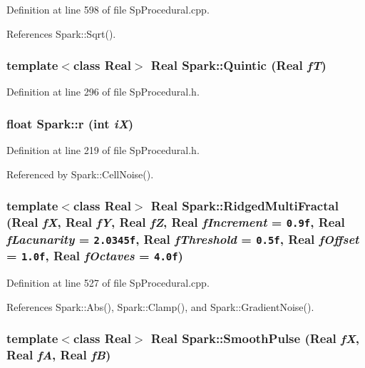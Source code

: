 Definition at line 598 of file Sp\-Procedural.cpp.

References Spark::Sqrt().
\subsubsection{\setlength{\rightskip}{0pt plus 5cm}template$<$class Real$>$ Real Spark::Quintic (Real {\em f\-T})}\label{namespaceSpark_a99}


Definition at line 296 of file Sp\-Procedural.h.
\subsubsection{\setlength{\rightskip}{0pt plus 5cm}float Spark::r (int {\em i\-X})\hspace{0.3cm}{\tt  [inline]}}\label{namespaceSpark_a92}


Definition at line 219 of file Sp\-Procedural.h.

Referenced by Spark::Cell\-Noise().
\subsubsection{\setlength{\rightskip}{0pt plus 5cm}template$<$class Real$>$ Real Spark::Ridged\-Multi\-Fractal (Real {\em f\-X}, Real {\em f\-Y}, Real {\em f\-Z}, Real {\em f\-Increment} = {\tt 0.9f}, Real {\em f\-Lacunarity} = {\tt 2.0345f}, Real {\em f\-Threshold} = {\tt 0.5f}, Real {\em f\-Offset} = {\tt 1.0f}, Real {\em f\-Octaves} = {\tt 4.0f})}\label{namespaceSpark_a81}


Definition at line 527 of file Sp\-Procedural.cpp.

References Spark::Abs(), Spark::Clamp(), and Spark::Gradient\-Noise().
\subsubsection{\setlength{\rightskip}{0pt plus 5cm}template$<$class Real$>$ Real Spark::Smooth\-Pulse (Real {\em f\-X}, Real {\em f\-A}, Real {\em f\-B})}\label{namespaceSpark_a105}


